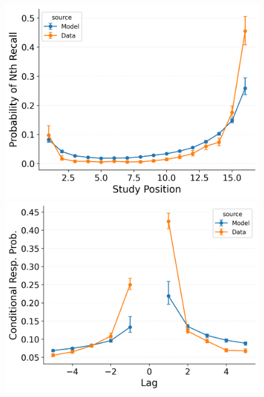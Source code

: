 \documentclass[
  man,
  floatsintext,
  longtable,
  nolmodern,
  notxfonts,
  notimes,
  draftfirst,
  colorlinks=true,linkcolor=blue,citecolor=blue,urlcolor=blue]{apa7}
\begin{document}
\begin{figure}
\begin{minipage}{0.33\linewidth}
\includegraphics{figures/HealeyKahana2014_CRU_with_Primacy_and_StartDrift_Fitting_pnr.png}\end{minipage}%
%
\begin{minipage}{0.33\linewidth}
\includegraphics{figures/HealeyKahana2014_CRU_with_Primacy_and_StartDrift_Fitting_crp.png}\end{minipage}%
%
\begin{minipage}{0.33\linewidth}

\end{minipage}
\end{figure}
\end{document}
